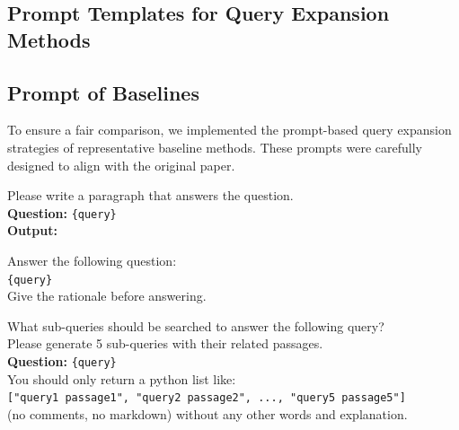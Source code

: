 \subsection*{Prompt Templates for Query Expansion Methods}

\subsection*{Prompt of Baselines}

To ensure a fair comparison, we implemented the prompt-based query expansion strategies of representative baseline methods.
These prompts were carefully designed to align with the original paper. 

\begin{tcolorbox}[colback=blue!5!white, colframe=blue!75!black, title=HyDE Prompt]
Please write a paragraph that answers the question.\\
\textbf{Question:} \texttt{\{query\}}\\
\textbf{Output:}
\end{tcolorbox}



\begin{tcolorbox}[colback=blue!5!white, colframe=blue!75!black, title=Query2Term Prompt]
Answer the following question:\\
\texttt{\{query\}}\\
Give the rationale before answering.
\end{tcolorbox}



\begin{tcolorbox}[colback=blue!5!white, colframe=blue!75!black, title=MILL Prompt]
What sub-queries should be searched to answer the following query?\\
Please generate 5 sub-queries with their related passages.\\
\textbf{Question:} \texttt{\{query\}}\\
You should only return a python list like:\\
\texttt{["query1 passage1", "query2 passage2", ..., "query5 passage5"]}\\
(no comments, no markdown) without any other words and explanation.
\end{tcolorbox}



